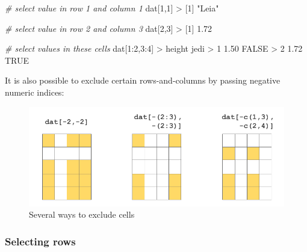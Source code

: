 \documentclass[
]{book}
\newenvironment{Shaded}{\begin{snugshade}}{\end{snugshade}}
\newcommand{\CommentTok}[1]{\textcolor[rgb]{0.56,0.35,0.01}{\textit{#1}}}
\newcommand{\ConstantTok}[1]{\textcolor[rgb]{0.00,0.00,0.00}{#1}}
\newcommand{\DecValTok}[1]{\textcolor[rgb]{0.00,0.00,0.81}{#1}}
\newcommand{\FloatTok}[1]{\textcolor[rgb]{0.00,0.00,0.81}{#1}}
\newcommand{\NormalTok}[1]{#1}
\newcommand{\SpecialCharTok}[1]{\textcolor[rgb]{0.00,0.00,0.00}{#1}}
\newcommand{\StringTok}[1]{\textcolor[rgb]{0.31,0.60,0.02}{#1}}
\begin{document}
\begin{Shaded}
\begin{Highlighting}[]
\CommentTok{\# select value in row 1 and column 1}
\NormalTok{dat[}\DecValTok{1}\NormalTok{,}\DecValTok{1}\NormalTok{]}
\SpecialCharTok{\textgreater{}}\NormalTok{ [}\DecValTok{1}\NormalTok{] }\StringTok{"Leia"}

\CommentTok{\# select value in row 2 and column 3}
\NormalTok{dat[}\DecValTok{2}\NormalTok{,}\DecValTok{3}\NormalTok{]}
\SpecialCharTok{\textgreater{}}\NormalTok{ [}\DecValTok{1}\NormalTok{] }\FloatTok{1.72}

\CommentTok{\# select values in these cells}
\NormalTok{dat[}\DecValTok{1}\SpecialCharTok{:}\DecValTok{2}\NormalTok{,}\DecValTok{3}\SpecialCharTok{:}\DecValTok{4}\NormalTok{]}
\SpecialCharTok{\textgreater{}}\NormalTok{   height  jedi}
\SpecialCharTok{\textgreater{}} \DecValTok{1}   \FloatTok{1.50} \ConstantTok{FALSE}
\SpecialCharTok{\textgreater{}} \DecValTok{2}   \FloatTok{1.72}  \ConstantTok{TRUE}
\end{Highlighting}
\end{Shaded}

It is also possible to exclude certain rows-and-columns by passing negative
numeric indices:

\begin{figure}

{\centering \includegraphics[width=0.8\linewidth]{images/objects/obj-dataframe-cells2} 

}

\caption{Several ways to exclude cells}\label{fig:unnamed-chunk-176}
\end{figure}

\hypertarget{selecting-rows-1}{%
\subsubsection*{Selecting rows}\label{selecting-rows-1}}
\end{document}
